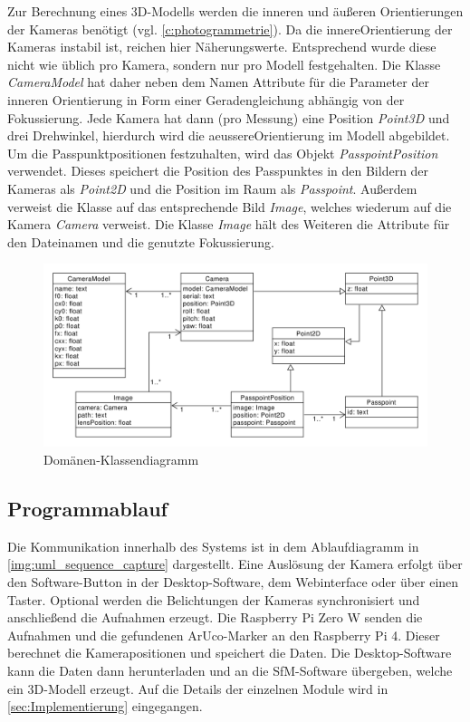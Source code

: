 \documentclass[./00PhotoBox.tex]{subfiles}
\begin{document}
Zur Berechnung eines 3D-Modells werden die inneren und äußeren Orientierungen der Kameras benötigt (vgl. \autoref{c:photogrammetrie}). Da die \gls{innereOrientierung} der Kameras instabil ist, reichen hier Näherungswerte. Entsprechend wurde diese nicht wie üblich pro Kamera, sondern nur pro Modell festgehalten. Die Klasse \textit{CameraModel} hat daher neben dem Namen Attribute für die Parameter der inneren Orientierung in Form einer Geradengleichung abhängig von der Fokussierung. Jede Kamera hat dann (pro Messung) eine Position  \textit{Point3D} und drei Drehwinkel, hierdurch wird die \gls{aeussereOrientierung} im Modell abgebildet. Um die Passpunktpositionen festzuhalten, wird das Objekt \textit{PasspointPosition} verwendet. Dieses speichert die Position des Passpunktes in den Bildern der Kameras als \textit{Point2D} und die Position im Raum als \textit{Passpoint}. Außerdem verweist die Klasse auf das entsprechende Bild \textit{Image}, welches wiederum auf die Kamera \textit{Camera} verweist. Die Klasse \textit{Image} hält des Weiteren die Attribute für den Dateinamen und die genutzte Fokussierung.

\begin{figure}
    \centering
    \includegraphics[width=1\textwidth]{./img/uml/uml_domain.pdf}
    \caption{Domänen-Klassendiagramm}
    \label{img:dokladia}
\end{figure}

\subsection{Programmablauf}
Die Kommunikation innerhalb des Systems ist in dem Ablaufdiagramm in \autoref{img:uml_sequence_capture} dargestellt. Eine Auslösung der Kamera erfolgt über den Software-Button in der Desktop-Software, dem Webinterface oder über einen Taster. Optional werden die Belichtungen der Kameras synchronisiert und anschließend die Aufnahmen erzeugt. Die Raspberry Pi Zero W senden die Aufnahmen und die gefundenen ArUco-Marker an den Raspberry Pi 4. Dieser berechnet die Kamerapositionen und speichert die Daten. Die Desktop-Software kann die Daten dann herunterladen und an die \Gls{SfM}-Software übergeben, welche ein 3D-Modell erzeugt. Auf die Details der einzelnen Module wird in \autoref{sec:Implementierung} eingegangen.
\end{document}
